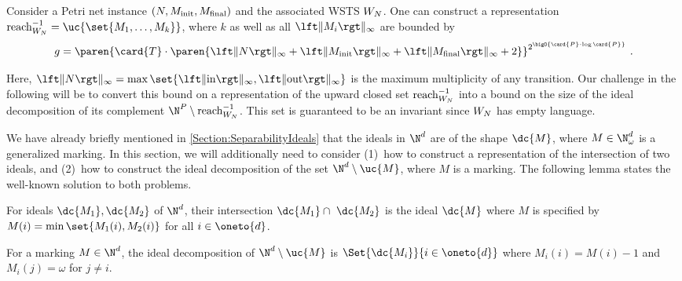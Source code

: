 \documentclass[../../diss.tex]{subfiles}
\begin{document}
\begin{theorem}%
\label{Theorem:SeparabilityBozzelliGanty}%
    Consider a Petri net instance $(N,M_{\text{init}},M_{\text{final}})$ and the associated WSTS $W_N$.
    One can construct a representation
    $\reachrev{\wstsN}=\uc{\set{M_1, \ldots, M_k}}$, where $k$ as well as all $\norminf{M_i}$ are bounded by
    \[
        g =
        \paren
        {
            \card{T} \cdot
            \paren
            {
                \norminf{N}
                +
                \norminf{M_\init}
                +
                \norminf{M_\final}
                +
                2
            }
        }^{2^{\bigO{\card{P} \cdot \log \card{P}}}}
        \ .
    \]
\end{theorem}

Here, $\norminf{N} = \max \set{ \norminf{\i}, \norminf{\o}}$ is the maximum multiplicity of any transition.
Our challenge in the following will be to convert this bound on a representation of the upward closed set $\reachrev{\wstsN}$ into a bound on the size of the ideal decomposition of its complement $\N^P \setminus \reachrev{\wstsN}$.
This set is guaranteed to be an invariant since $W_N$ has empty language.

We have already briefly mentioned in \cref{Section:SeparabilityIdeals} that the ideals in $\N^d$ are of the shape $\dc{M}$, where $M \in \N_\omega^d$ is a generalized marking.
In this section, we will additionally need to consider (1)~how to construct a representation of the intersection of two ideals, and (2)~how to construct the ideal decomposition of the set $\N^d \setminus \uc{M}$, where $M$ is a marking.
The following lemma states the well-known solution to both problems.

%
\cheatpagebreak
%

\begin{lemma}%
\label{Lemma:SeparabilityIdealOperations}%
    \begin{thmenumerate}[a)]
        \item
            For ideals $\dc{M_1}, \dc{M_2}$ of $\N^d$, their intersection $\dc{M_1} \cap \ \dc{M_2}$ is the ideal $\dc{M}$ where $M$ is specified by $M(i) = \min \set{ M_1(i), M_2(i)}$ for all $i \in \oneto{d}$.
        \item
            For a marking $M \in \N^d$, the ideal decomposition of $\N^d \setminus \uc{M}$ is $\Set{ \dc{M_i}}{ i \in \oneto{d}}$ where $M_i(i) = M(i) - 1$ and $M_i(j) = \omega$ for $j \neq i$.
    \end{thmenumerate}
\end{lemma}
\end{document}
